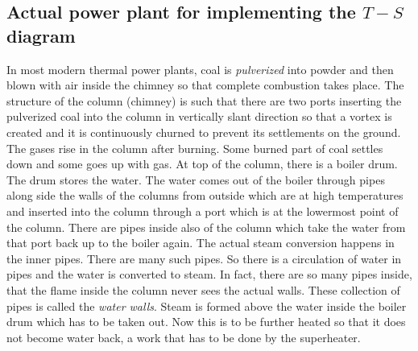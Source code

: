 \documentclass{report}
\begin{document}
\subsection{Actual power plant for implementing the $T-S$ diagram}
\par In most modern thermal power plants, coal is {\it pulverized} into powder and then blown with air inside the chimney so that complete combustion takes place. The structure of the column (chimney) is such that there are two ports inserting the pulverized coal into the column in vertically slant direction so that a vortex is created and it is continuously churned to prevent its settlements on the ground. The gases rise in the column after burning. Some burned part of coal settles down and some goes up with gas. At top of the column, there is a boiler drum. The drum stores the water. The water comes out of the boiler through pipes along side the walls of the columns from outside which are at high temperatures and inserted into the column through a port which is at the lowermost point of the column. There are pipes inside also of the column which take the water from that port back up to the boiler again. The actual steam conversion happens in the inner pipes. There are many such pipes. So there is a circulation of water in pipes and the water is converted to steam. In fact, there are so many pipes inside, that the flame inside the column never sees the actual walls. These collection of pipes is called the {\it water walls}. Steam is formed above the water inside the boiler drum which has to be taken out. Now this is to be further heated so that it does not become water back, a work that has to be done by the superheater.
\end{document}
